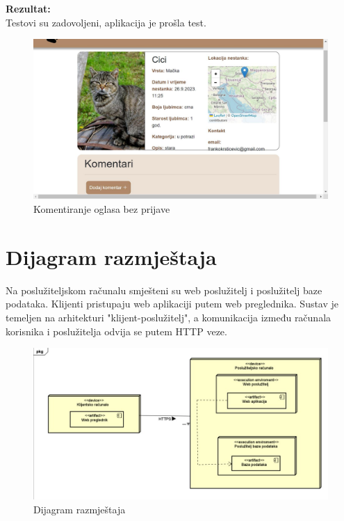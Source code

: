 			\noindent \textbf{Rezultat:}\\
			Testovi su zadovoljeni, aplikacija je prošla test.\\
			\begin{figure}[H]
				\includegraphics[width=\textwidth]{komentar_bez_prijave.JPEG}
				\centering
				\caption{Komentiranje oglasa bez prijave}
				\label{fig:komentiranjeoglasabezprijave}
			\end{figure}
			
			\eject 
		
		
		\section{Dijagram razmještaja}
			
			
			
			Na poslužiteljskom računalu smješteni su web poslužitelj i poslužitelj baze podataka. Klijenti pristupaju web aplikaciji putem web preglednika. Sustav je temeljen na arhitekturi "klijent-poslužitelj", a komunikacija između računala korisnika i poslužitelja odvija se putem HTTP veze.
			
			\begin{figure}[H]
				\includegraphics[width=\textwidth]{dijagram_razmjestaja.JPEG}
				\centering
				\caption{Dijagram razmještaja}
				\label{fig:dijagramrazmjestaja}
			\end{figure}
			
